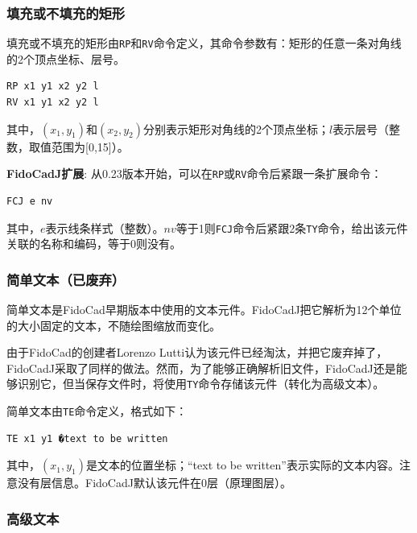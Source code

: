 \documentclass[10pt,a4paper,twoside]{scrreprt}
\begin{document}
\subsubsection{填充或不填充的矩形}

填充或不填充的矩形由\lstinline!RP!和\lstinline!RV!命令定义，其命令参数有：矩形的任意一条对角线的2个顶点坐标、层号。
\begin{lstlisting} 
RP x1 y1 x2 y2 l 
RV x1 y1 x2 y2 l 
\end{lstlisting}
其中，$(x_{1},y_{1})$和$(x_{2},y_{2})$分别表示矩形对角线的2个顶点坐标；$l$表示层号（整数，取值范围为[0,15]）。

\textbf{FidoCadJ扩展}: 从0.23版本开始，可以在\lstinline!RP!或\lstinline!RV!命令后紧跟一条扩展命令：
\begin{lstlisting} 
FCJ e nv
\end{lstlisting}
其中，$e$表示线条样式（整数）。$nv$等于1则\lstinline!FCJ!命令后紧跟2条\lstinline!TY!命令，给出该元件关联的名称和编码，等于0则没有。 

\subsubsection{简单文本（已废弃）}

简单文本是FidoCad早期版本中使用的文本元件。FidoCadJ把它解析为12个单位的大小固定的文本，不随绘图缩放而变化。

由于FidoCad的创建者Lorenzo Lutti认为该元件已经淘汰，并把它废弃掉了，FidoCadJ采取了同样的做法。然而，为了能够正确解析旧文件，FidoCadJ还是能够识别它，但当保存文件时，将使用\lstinline!TY!命令存储该元件（转化为高级文本）。

简单文本由\lstinline!TE!命令定义，格式如下：
\begin{lstlisting} 
TE x1 y1 �text to be written 
\end{lstlisting}
其中，$(x_{1},y_{1})$是文本的位置坐标；“text to be written”表示实际的文本内容。注意没有层信息。FidoCadJ默认该元件在0层（原理图层）。

\subsubsection{高级文本}
\end{document}
